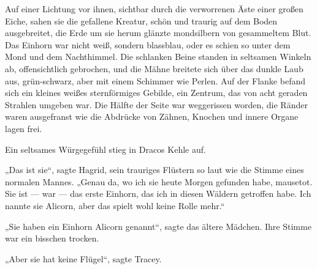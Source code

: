 Auf einer Lichtung vor ihnen, sichtbar durch die verworrenen Äste einer großen Eiche, sahen sie die gefallene Kreatur, schön und traurig auf dem Boden ausgebreitet, die Erde um sie herum glänzte mondsilbern von gesammeltem Blut. Das Einhorn war nicht weiß, sondern blassblau, oder es schien so unter dem Mond und dem Nachthimmel. Die schlanken Beine standen in seltsamen Winkeln ab, offensichtlich gebrochen, und die Mähne breitete sich über das dunkle Laub aus, grün-schwarz, aber mit einem Schimmer wie Perlen. Auf der Flanke befand sich ein kleines weißes sternförmiges Gebilde, ein Zentrum, das von acht geraden Strahlen umgeben war. Die Hälfte der Seite war weggerissen worden, die Ränder waren ausgefranst wie die Abdrücke von Zähnen, Knochen und innere Organe lagen frei.

Ein seltsames Würgegefühl stieg in Dracos Kehle auf.

„Das ist sie“, sagte Hagrid, sein trauriges Flüstern so laut wie die Stimme eines normalen Mannes.
„Genau da, wo ich sie heute Morgen gefunden habe, mausetot. Sie ist — war — das erste Einhorn, das ich in diesen Wäldern getroffen habe. Ich nannte sie Alicorn, aber das spielt wohl keine Rolle mehr.“

„Sie haben ein Einhorn Alicorn genannt“, sagte das ältere Mädchen. Ihre Stimme war ein bisschen trocken.

„Aber sie hat keine Flügel“, sagte Tracey.

